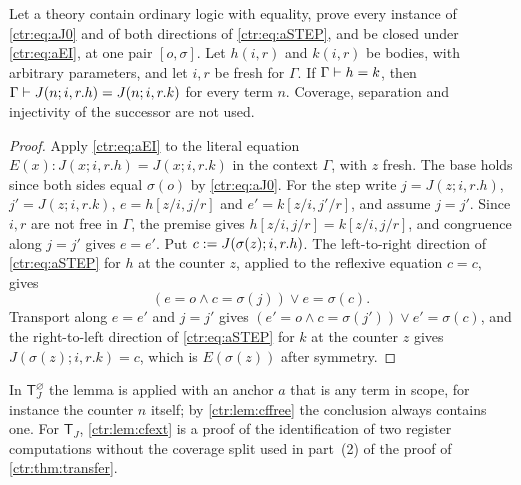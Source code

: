 \begin{lemma}\label{ctr:lem:cfext}
Let a theory contain ordinary logic with equality, prove every instance of
\eqref{ctr:eq:aJ0} and of both directions of \eqref{ctr:eq:aSTEP}, and be closed under
\eqref{ctr:eq:aEI}, at one pair $[o,\sigma]$. Let $h(i,r)$ and $k(i,r)$ be bodies, with
arbitrary parameters, and let $i,r$ be fresh for $\Gamma$. If $\Gamma\vdash h=k$, then
$\Gamma\vdash J(n;i,r.h)=J(n;i,r.k)$ for every term $n$. Coverage, separation and
injectivity of the successor are not used.
\end{lemma}
\begin{proof}
Apply \eqref{ctr:eq:aEI} to the literal equation $E(x)\colon J(x;i,r.h)=J(x;i,r.k)$ in the
context $\Gamma$, with $z$ fresh. The base holds since both sides equal $\sigma(o)$ by
\eqref{ctr:eq:aJ0}. For the step write $j=J(z;i,r.h)$, $j'=J(z;i,r.k)$, $e=h[z/i,j/r]$ and
$e'=k[z/i,j'/r]$, and assume $j=j'$. Since $i,r$ are not free in $\Gamma$, the premise gives
$h[z/i,j/r]=k[z/i,j/r]$, and congruence along $j=j'$ gives $e=e'$. Put
$c\mathrel{:=} J(\sigma(z);i,r.h)$. The left-to-right direction of \eqref{ctr:eq:aSTEP} for $h$
at the counter $z$, applied to the reflexive equation $c=c$, gives
\[
 (e=o\land c=\sigma(j))\lor e=\sigma(c).
\]
Transport along $e=e'$ and $j=j'$ gives $(e'=o\land c=\sigma(j'))\lor e'=\sigma(c)$, and the
right-to-left direction of \eqref{ctr:eq:aSTEP} for $k$ at the counter $z$ gives
$J(\sigma(z);i,r.k)=c$, which is $E(\sigma(z))$ after symmetry.
\end{proof}

In $\mathsf T_J^{\varnothing}$ the lemma is applied with an anchor $a$ that is any term in
scope, for instance the counter $n$ itself; by \cref{ctr:lem:cffree} the conclusion always
contains one. For $\mathsf T_J$, \cref{ctr:lem:cfext} is a proof of the identification of
two register computations without the coverage split used in part~(2) of the proof of
\cref{ctr:thm:transfer}.

